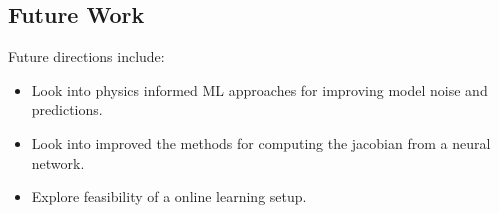 \documentclass[conference]{IEEEtran}
\begin{document}
\subsection{Future Work}


Future directions include:
\begin{itemize}
    \item Look into physics informed ML approaches for improving model noise and predictions.
    \item Look into improved the methods for computing the jacobian from a neural network.
    \item Explore feasibility of a online learning setup.
\end{itemize}
\end{document}
